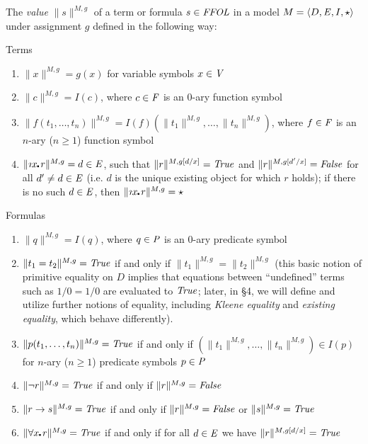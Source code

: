 \begin{definition}
  The \emph{value} $\| s \|^{M,g}$ of a term or formula $s\in\FFOL$
  in a model $M=\langle D, \ex, I, \star\rangle$ under assignment $g$ 
  defined in the following way:
\noindent
\begin{description}
\item{Terms}
\begin{enumerate}
\item $\| x \|^{M,g} = g(x)$ for variable symbols $x\in\V$
\item $\| c \|^{M,g} = I(c)$, where $c\in\F$ is an $0$-ary function symbol
\item $\| f(t_1,\ldots,t_n)\|^{M,g} = I(f)(\| t_1 \|^{M,g},\ldots,\|
  t_n \|^{M,g})$, where $f\in\F$ is an $n$-ary ($n\geq 1$) function symbol
\item $\| \Descr x\lambdot r \|^{M,g} = d \in \ex$, such that $\| r
  \|^{M,g[d/x]} = \True$ and  $\| r
  \|^{M,g[d'/x]} = \False$ for all $d'\not=d\in \ex$ (i.e. $d$ is the
  unique existing object for which $r$ holds); if there is no
  such $d\in \ex$, then $\| \Descr x\lambdot r \|^{M,g} = \star$
 \setcounter{enumTemp}{\theenumi}
\end{enumerate}

\item{Formulas}
\begin{enumerate}
\setcounter{enumi}{\theenumTemp}
\item $\| q \|^{M,g} = I(q)$, where $q\in\P$ is an $0$-ary predicate
  symbol
\item $\| t_1 = t_2 \|^{M,g} = \True$ if and only if $\| t_1 \|^{M,g} = \| t_2
  \|^{M,g}$ (this basic notion of primitive equality on $D$ implies
  that equations between ``undefined'' terms such as $1/0 = 1/0$ are
  evaluated to $\True$; later, in \S4, we will
  define and utilize further notions of equality, including \emph{Kleene equality}
  and \emph{existing equality}, which behave differently).
\item $\| p(t_1,\ldots,t_n) \|^{M,g} = \True$ if and only if $(\| t_1 \|^{M,g},\ldots,\|
  t_n \|^{M,g}) \in I(p)$ for $n$-ary ($n\geq 1$) predicate symbols
  $p\in\P$
\item $\| \neg r \|^{M,g} = \True$ if and only if $\| r \|^{M,g} = \False$
\item $\| r \Impl s \|^{M,g} = \True$ if and only if $\| r \|^{M,g} = \False$
  or $\| s \|^{M,g} = \True$
\item $\| \forall x\lambdot r  \|^{M,g} = \True$ if and only if for all $d \in \ex$ we
  have $\|  r  \|^{M,g[d/x]} = \True$ %
\end{enumerate}
\end{description}

\end{definition}
 

